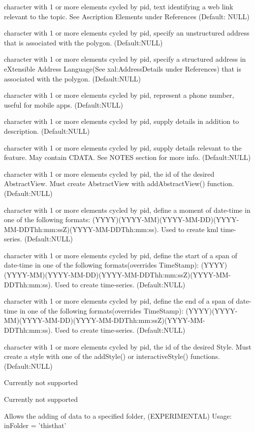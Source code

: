 \documentclass[a4paper]{book}
\begin{document}
\begin{Arguments}
\begin{ldescription}
\item[\code{atomlinkhref}] character with 1 or more elements cycled by pid, text identifying a web link relevant to the topic. See Ascription Elements under References (Default: NULL) 
\item[\code{address}] character with 1 or more elements cycled by pid, specify an unstructured address that is associated with the polygon. (Default:NULL) 
\item[\code{xalAddressDetails}] character with 1 or more elements cycled by pid, specify a structured address in eXtensible Address Language(See xal:AddressDetails under References) that is associated with the polygon. (Default:NULL) 
\item[\code{phoneNumber}]  character with 1 or more elements cycled by pid, represent a phone number, useful for mobile apps. (Default:NULL) 
\item[\code{Snippet}] character with 1 or more elements cycled by pid, supply details in addition to description. (Default:NULL)
\item[\code{description}] character with 1 or more elements cycled by pid, supply details relevant to the feature. May contain CDATA. See NOTES section for more info. (Default:NULL)
\item[\code{AbstractView}] character with 1 or more elements cycled by pid, the id of the desired AbstractView. Must create AbstractView with addAbstractView() function. (Default:NULL)
\item[\code{TimeStamp}]  character with 1 or more elements cycled by pid, define a moment of date-time in one of the following formats: (YYYY)(YYYY-MM)(YYYY-MM-DD)(YYYY-MM-DDThh:mm:ssZ)(YYYY-MM-DDThh:mm:ss). Used to create kml time-series. (Default:NULL)
\item[\code{TimeSpanStart}]  character with 1 or more elements cycled by pid, define the start of a span of date-time in one of the following formats(overrides TimeStamp): (YYYY)(YYYY-MM)(YYYY-MM-DD)(YYYY-MM-DDThh:mm:ssZ)(YYYY-MM-DDThh:mm:ss). Used to create time-series. (Default:NULL)
\item[\code{TimeSpanEnd}]  character with 1 or more elements cycled by pid, define the end of a span of date-time in one of the following formats(overrides TimeStamp): (YYYY)(YYYY-MM)(YYYY-MM-DD)(YYYY-MM-DDThh:mm:ssZ)(YYYY-MM-DDThh:mm:ss). Used to create time-series. (Default:NULL) 
\item[\code{styleUrl}] character with 1 or more elements cycled by pid, the id of the desired Style. Must create a style with one of the addStyle() or interactiveStyle() functions. (Default:NULL)
\item[\code{Region}] Currently not supported
\item[\code{ExtendedData}] Currently not supported
\item[\code{inFolder}] Allows the adding of data to a specified folder, (EXPERIMENTAL) Usage: inFolder = 'this\bsl{}that'      


\end{ldescription}
\end{Arguments}
\end{document}
